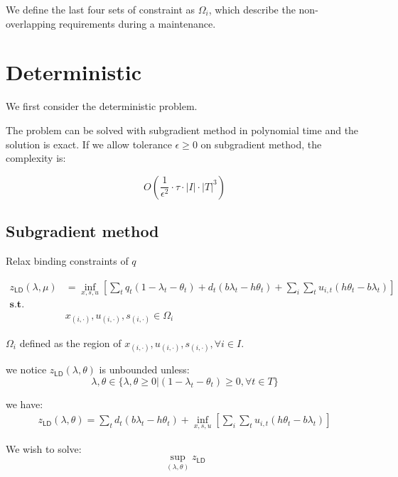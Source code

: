 \documentclass[
  a4paper,
,tablecaptionabove
]{scrartcl}
\numberwithin{equation}{section}
\begin{document}
We define the last four sets of constraint as \(\Omega_i\), which
describe the non-overlapping requirements during a maintenance.

\hypertarget{sec:deterministic}{%
  \section{Deterministic}\label{deterministic}}

We first consider the deterministic problem.

The problem can be solved with subgradient method in polynomial time and
the solution is exact. If we allow tolerance \(\epsilon \ge 0\) on
subgradient method, the complexity is:

\[O\left(\frac{1}{\epsilon^2}\cdot\tau\cdot|I|\cdot|T|^3\right)\]

\hypertarget{sec:subgradient-method}{%
  \subsection{Subgradient method}\label{subgradient-method}}

Relax binding constraints of \(q\)

\[\begin{aligned}
    z_{\mathsf{LD}}(\lambda, \mu) & = \inf_{x, s, u} \left[ \sum_t
      q_t (1-\lambda_t - \theta_t) + d_t(b\lambda_t -h \theta_t)
    + \sum_i \sum_t u_{i,t}(h\theta_t - b\lambda_t) \right]                                  \\
    \mathbf {s.t. }               &                                                          \\
                                  & x_{(i,\cdot)}, u_{(i,\cdot)}, s_{(i,\cdot)} \in \Omega_i
  \end{aligned}\]

\(\Omega_i\) defined as the region of
\(x_{(i,\cdot)}, u_{(i,\cdot)}, s_{(i,\cdot)}, \forall i\in I\).

we notice \(z_{\mathsf{LD}}(\lambda, \theta)\) is unbounded unless:
\[\lambda, \theta \in \{\lambda, \theta \ge 0 \big | (1-\lambda_t - \theta_t) \ge 0,\forall t\in T\}\]

we have: \[\begin{aligned}
    z_{\mathsf{LD}}(\lambda, \theta) = \sum_t
    d_t(b\lambda_t -h \theta_t) + \inf_{x, s, u} \left[  \sum_i \sum_t u_{i,t}(h\theta_t - b\lambda_t) \right]
  \end{aligned}\]

We wish to solve: \[\sup_{(\lambda, \theta)}z_{\mathsf{LD}}\]
\end{document}
